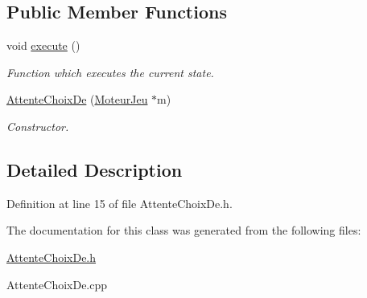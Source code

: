 \subsection*{Public Member Functions}
\begin{DoxyCompactItemize}
\item 
\hypertarget{class_attente_choix_de_a1b9bb07a0826123356007b6fe7d91b2f}{
void \hyperlink{class_attente_choix_de_a1b9bb07a0826123356007b6fe7d91b2f}{execute} ()}
\label{class_attente_choix_de_a1b9bb07a0826123356007b6fe7d91b2f}

\begin{DoxyCompactList}\small\item\em Function which executes the current state. \item\end{DoxyCompactList}\item 
\hypertarget{class_attente_choix_de_a11f3691cb620dd1a1a70478e7b2fc5d6}{
\hyperlink{class_attente_choix_de_a11f3691cb620dd1a1a70478e7b2fc5d6}{AttenteChoixDe} (\hyperlink{class_moteur_jeu}{MoteurJeu} $\ast$m)}
\label{class_attente_choix_de_a11f3691cb620dd1a1a70478e7b2fc5d6}

\begin{DoxyCompactList}\small\item\em Constructor. \item\end{DoxyCompactList}\end{DoxyCompactItemize}


\subsection{Detailed Description}


Definition at line 15 of file AttenteChoixDe.h.



The documentation for this class was generated from the following files:\begin{DoxyCompactItemize}
\item 
\hyperlink{_attente_choix_de_8h}{AttenteChoixDe.h}\item 
AttenteChoixDe.cpp\end{DoxyCompactItemize}
